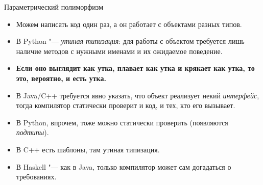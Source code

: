 \begin{frame}[t]{Параметрический полиморфизм}
\begin{itemize}
\item
	Можем написать код один раз, а он работает с объектами разных типов.
\item
	В Python "--- \textit{утиная типизация}: для работы с объектом требуется
	лишь наличие методов с нужными именами и их ожидаемое поведение.
\item
    \textbf{Если оно выглядит как утка, плавает как утка и крякает как утка, то это, вероятно, и есть утка.}
\item
	В Java/C++ требуется явно указать, что объект реализует некий \textit{интерфейс},
	тогда компилятор статически проверит и код, и тех, кто его вызывает.
\item
	В Python, впрочем, тоже можно статически проверить (появляются \textit{подтипы}).
\item
	В C++ есть шаблоны, там утиная типизация.
\item
	В Haskell "--- как в Java, только компилятор может сам догадаться о требованиях.
\end{itemize}
\end{frame}
